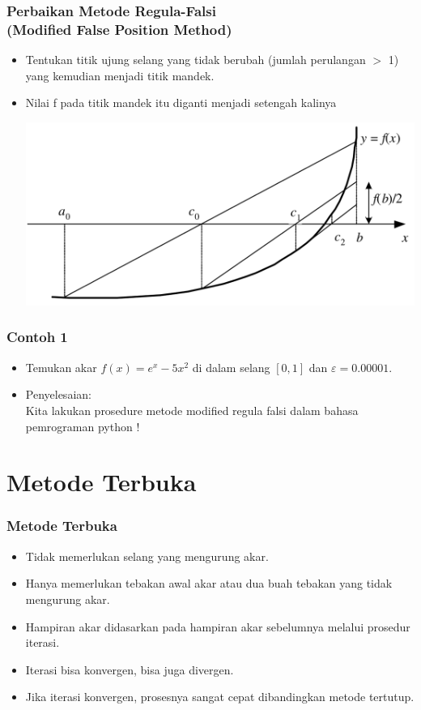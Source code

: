 \documentclass[pdflatex,compress]{beamer}
\begin{document}
\begin{frame}
	\frametitle{Perbaikan Metode Regula-Falsi \\ (Modified False Position Method)}
	\begin{itemize}
		\item Tentukan titik ujung selang yang tidak berubah (jumlah perulangan $ > $ 1) yang kemudian menjadi titik mandek.
		\item Nilai f pada titik mandek itu diganti menjadi setengah kalinya
		\begin{center}
			\includegraphics[height=0.5\textheight]{img/img12}
		\end{center}
	\end{itemize}
\end{frame}

\begin{frame}
	\frametitle{Contoh 1}
	\begin{itemize}
		\item Temukan akar $ f(x) = e^x - 5x^2 $ di dalam selang $ [0, 1] $ dan $ \varepsilon = 0.00001 $.
		\item Penyelesaian:\\Kita lakukan prosedure metode modified regula falsi dalam bahasa pemrograman python !
	\end{itemize}
\end{frame}

\section{Metode Terbuka}

\begin{frame}
	\frametitle{Metode Terbuka}
	\begin{itemize}
		\item Tidak memerlukan selang yang mengurung akar.
		\item Hanya memerlukan tebakan awal akar atau dua buah tebakan yang tidak mengurung akar.
		\item Hampiran akar didasarkan pada hampiran akar sebelumnya melalui prosedur iterasi.
		\item Iterasi bisa konvergen, bisa juga divergen.
		\item Jika iterasi konvergen, prosesnya sangat cepat dibandingkan metode tertutup.
	\end{itemize}
\end{frame}
\end{document}
